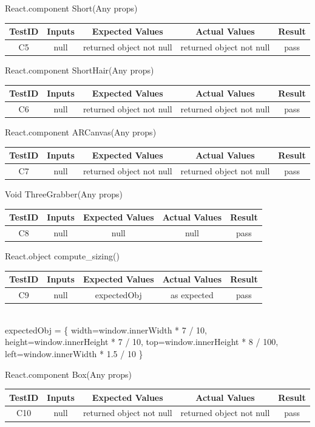 \documentclass[12pt, titlepage]{article}
\begin{document}
React.component Short(Any props) \\
\begin{tabular}{ |c|c|c|c|c| } 
 \hline
 TestID & Inputs & Expected Values & Actual Values & Result \\ 
 \hline
 C5 & null & returned object not null & returned object not null & pass \\ 
 \hline
\end{tabular}

React.component ShortHair(Any props) \\
\begin{tabular}{ |c|c|c|c|c| } 
 \hline
 TestID & Inputs & Expected Values & Actual Values & Result \\ 
 \hline
 C6 & null & returned object not null & returned object not null & pass \\ 
 \hline
\end{tabular}

React.component ARCanvas(Any props) \\
\begin{tabular}{ |c|c|c|c|c| } 
 \hline
 TestID & Inputs & Expected Values & Actual Values & Result \\ 
 \hline
 C7 & null & returned object not null & returned object not null & pass \\ 
 \hline
\end{tabular}

Void ThreeGrabber(Any props) \\
\begin{tabular}{ |c|c|c|c|c| } 
 \hline
 TestID & Inputs & Expected Values & Actual Values & Result \\ 
 \hline
 C8 & null & null & null & pass \\ 
 \hline
\end{tabular}

React.object compute\_sizing() \\
\begin{tabular}{ |c|c|c|c|c| } 
 \hline
 TestID & Inputs & Expected Values & Actual Values & Result \\ 
 \hline
 C9 & null & expectedObj & as expected & pass \\ 
 \hline
\end{tabular}
\\
expectedObj = \{ width=window.innerWidth * 7 / 10, height=window.innerHeight * 7 / 10, top=window.innerHeight * 8 / 100, left=window.innerWidth * 1.5 / 10 \}

React.component Box(Any props) \\
\begin{tabular}{ |c|c|c|c|c| } 
 \hline
 TestID & Inputs & Expected Values & Actual Values & Result \\ 
 \hline
 C10 & null & returned object not null & returned object not null & pass \\ 
 \hline
\end{tabular}
\end{document}
